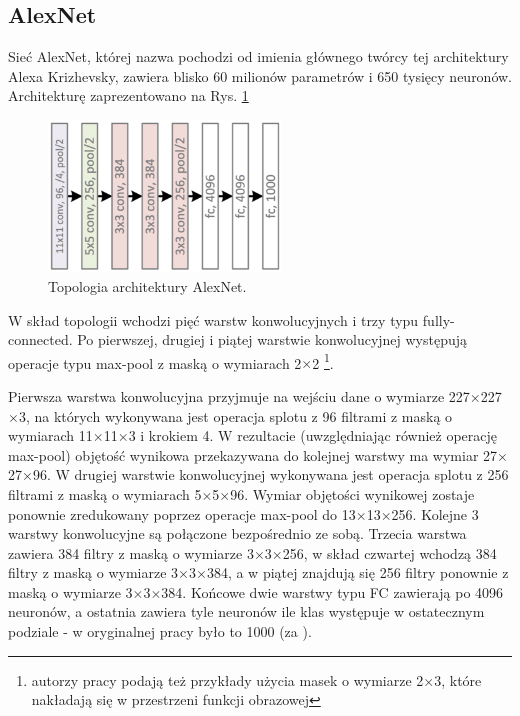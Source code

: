 \subsection{AlexNet}
\label{AlexNet}
Sieć AlexNet, której nazwa pochodzi od imienia głównego twórcy tej architektury Alexa Krizhevsky, zawiera blisko 60 milionów parametrów i 650 tysięcy neuronów. Architekturę zaprezentowano na Rys. \ref{AlexNetTopology}
\begin{figure}[h!]
	\centering
	\includegraphics[width=0.55\textwidth]{figures/AlexNet.png}
	\caption{Topologia architektury AlexNet.}
	\label{AlexNetTopology}
\end{figure}

W skład topologii wchodzi pięć warstw konwolucyjnych i trzy typu fully-connected. Po pierwszej, drugiej i piątej warstwie konwolucyjnej występują operacje typu max-pool z maską o wymiarach 2$\times$2 \footnote{autorzy pracy podają też przykłady użycia masek o wymiarze 2$\times$3, które nakładają się w przestrzeni funkcji obrazowej}. 

Pierwsza warstwa konwolucyjna przyjmuje na wejściu dane o wymiarze 227$\times$227$\times$3, na których wykonywana jest operacja splotu z 96 filtrami z maską o wymiarach 11$\times$11$\times$3 i krokiem 4. W rezultacie (uwzględniając również operację max-pool) objętość wynikowa przekazywana do kolejnej warstwy ma wymiar 27$\times$27$\times$96. W drugiej warstwie konwolucyjnej wykonywana jest operacja splotu z 256 filtrami z maską o wymiarach 5$\times$5$\times$96. Wymiar objętości wynikowej zostaje ponownie zredukowany poprzez operacje max-pool do 13$\times$13$\times$256. Kolejne 3 warstwy konwolucyjne są połączone bezpośrednio ze sobą. Trzecia warstwa zawiera 384 filtry z maską o wymiarze 3$\times$3$\times$256, w skład czwartej wchodzą 384 filtry z maską o wymiarze 3$\times$3$\times$384, a w piątej znajdują się 256 filtry ponownie z maską o wymiarze 3$\times$3$\times$384. Końcowe dwie warstwy typu FC zawierają po 4096 neuronów, a ostatnia zawiera tyle neuronów ile klas występuje w ostatecznym podziale - w oryginalnej pracy było to 1000 (za \cite{Krizhevsky2012}).

